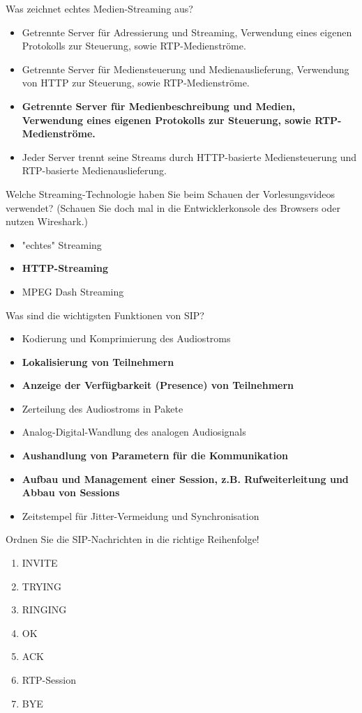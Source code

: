 \documentclass{article}
\begin{document}
	Was zeichnet echtes Medien-Streaming aus?
	\begin{itemize}
		\item Getrennte Server für Adressierung und Streaming, Verwendung eines eigenen Protokolls zur Steuerung, sowie RTP-Medienströme.
		\item Getrennte Server für Mediensteuerung und Medienauslieferung, Verwendung von HTTP zur Steuerung, sowie RTP-Medienströme.
		\item \textbf{Getrennte Server für Medienbeschreibung und Medien, Verwendung eines eigenen Protokolls zur Steuerung, sowie RTP-Medienströme.}
		\item Jeder Server trennt seine Streams durch HTTP-basierte Mediensteuerung und RTP-basierte Medienauslieferung.
	\end{itemize}

	Welche Streaming-Technologie haben Sie beim Schauen der Vorlesungsvideos verwendet? (Schauen Sie doch mal in die Entwicklerkonsole des Browsers oder nutzen Wireshark.)
	\begin{itemize}
		\item "echtes" Streaming 
		\item \textbf{HTTP-Streaming}
		\item MPEG Dash Streaming
	\end{itemize}

	Was sind die wichtigsten Funktionen von SIP?
	\begin{itemize}
		\item Kodierung und Komprimierung des Audiostroms
		\item \textbf{Lokalisierung von Teilnehmern}
		\item \textbf{Anzeige der Verfügbarkeit (Presence) von Teilnehmern }
		\item Zerteilung des Audiostroms in Pakete
		\item Analog-Digital-Wandlung des analogen Audiosignals
		\item \textbf{Aushandlung von Parametern für die Kommunikation}
		\item \textbf{Aufbau und Management einer Session, z.B. Rufweiterleitung und Abbau von Sessions} 
		\item Zeitstempel für Jitter-Vermeidung und Synchronisation
	\end{itemize}

	Ordnen Sie die SIP-Nachrichten in die richtige Reihenfolge!
	\begin{enumerate}
		\item INVITE
		\item TRYING
		\item RINGING
		\item OK
		\item ACK
		\item RTP-Session
		\item BYE
	\end{enumerate}
\end{document}
